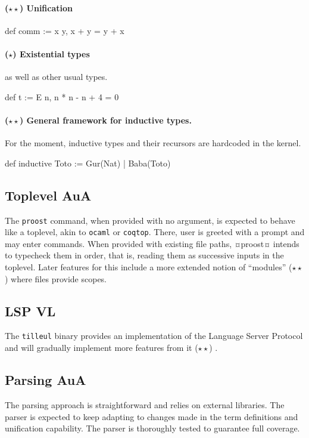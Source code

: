 \documentclass[twocolumn]{article}
\newcommand{\members}[1]{\texorpdfstring{\hfill\scriptsize #1}{}}
\newcommand{\etun}{{\color{Green} ($\star$)} }
\newcommand{\etde}{{\color{Orange} ($\star\star$)} }
\begin{document}
\paragraph{\etde Unification}
\phantom{hello}
\begin{proost}
def comm := \/x y, x + y = y + x
\end{proost}

\paragraph{\etun Existential types} as well as other usual types.
\begin{proost}
def t := E n, n * n - n + 4 = 0
\end{proost}

\paragraph{\etde General framework for inductive types.} For the moment,
inductive types and their recursors are hardcoded in the kernel.
\begin{proost}
def inductive Toto :=
  Gur(Nat) | Baba(Toto)
\end{proost}

\subsection{Toplevel  \members{AuA}}
The \texttt{proost} command, when provided with no argument, is expected to
behave like a toplevel, akin to \texttt{ocaml} or \texttt{coqtop}. There, user
is greeted with a prompt and may enter commands. When provided with existing
file paths, ¤proost¤ intends to typecheck them in order, that is, reading them
as successive inputs in the toplevel. Later features for this include a more
extended notion of ``modules'' \etde where files provide scopes.
\begin{center}
\end{center}


\subsection{LSP \members{VL}}
The \texttt{tilleul} binary provides an implementation of the Language Server
Protocol and will gradually implement more features from it \etde.

\subsection{Parsing \members{AuA}}
The parsing approach is straightforward and
relies on external libraries. The parser is expected to keep adapting to changes
made in the term definitions and unification capability. The parser is
thoroughly tested to guarantee full coverage.
\end{document}
